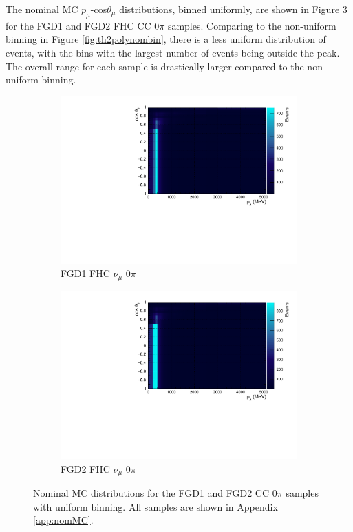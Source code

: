 The nominal MC $p_{\mu}$-cos$\theta_{\mu}$ distributions, binned uniformly, are shown in Figure \ref{fig:2dnom} for the FGD1 and FGD2 FHC CC 0$\pi$ samples. Comparing to the non-uniform binning in Figure \ref{fig:th2polynombin}, there is a less uniform distribution of events, with the bins with the largest number of events being outside the peak. The overall range for each sample is drastically larger compared to the non-uniform binning.

\begin{figure}[!htbp]
\centering
\begin{subfigure}{.7\textwidth}
  \centering
  \includegraphics[width=0.95\linewidth]{figs/NomMC_MC_FGD1_numuCC_0pi}
  \caption{FGD1 FHC $\nu_{\mu}$ 0$\pi$}
  \label{fig:2d_FGD1_numuCC_0pi}
\end{subfigure}
\begin{subfigure}{.7\textwidth}
  \centering
  \includegraphics[width=0.95\linewidth]{figs/NomMC_MC_FGD2_numuCC_0pi}
  \caption{FGD2 FHC $\nu_{\mu}$ 0$\pi$}
  \label{fig:2d_FGD2_numuCC_0pi}
\end{subfigure}
\caption{Nominal MC distributions for the FGD1 and FGD2 CC 0$\pi$ samples with uniform binning. All samples are shown in Appendix \ref{app:nomMC}.}
\label{fig:2dnom}
\end{figure}


